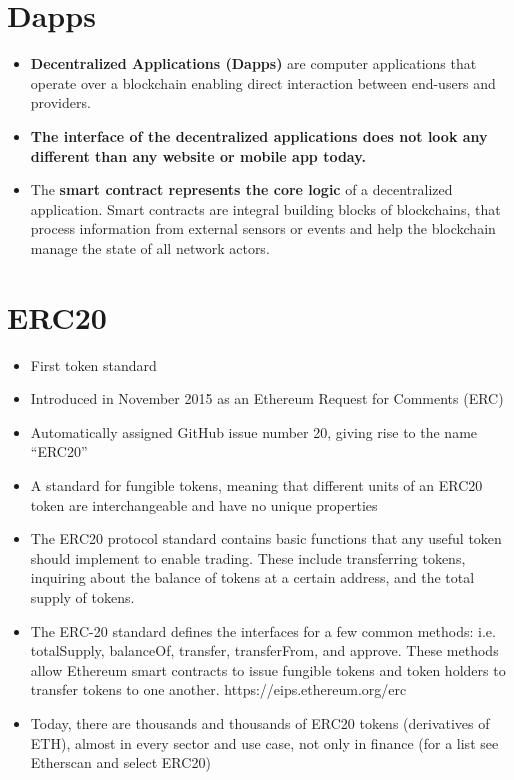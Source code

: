 \section{Dapps}
\begin{itemize}
	\item \textbf{Decentralized Applications (Dapps)} are computer applications that operate over a blockchain enabling direct interaction between end-users and providers.
	\item \textbf{The interface of the decentralized applications does not look any different than any website or mobile app today.}
	\item The\textbf{ smart contract represents the core logic} of a decentralized application. Smart contracts are integral building blocks of blockchains, that process information from external sensors or events and help the blockchain manage the state of all network actors.
\end{itemize}
\section{ERC20}
\begin{itemize}
	\item First token standard
	\item Introduced in November 2015 as an Ethereum Request for Comments (ERC)
	\item Automatically assigned GitHub issue number 20, giving rise to the name ``ERC20''
	\item A standard for fungible tokens, meaning that different units of an ERC20 token are interchangeable and have no unique properties
	\item The ERC20 protocol standard contains basic functions that any useful token should implement to enable trading. These include transferring tokens, inquiring about the balance of tokens at a certain address, and the total supply of tokens.
	\item The ERC-20 standard defines the interfaces for a few common methods: i.e. totalSupply, balanceOf, transfer, transferFrom, and approve. These methods allow Ethereum smart contracts to issue fungible tokens and token holders to transfer tokens to one another. https://eips.ethereum.org/erc
	\item Today, there are thousands and thousands of ERC20 tokens (derivatives of ETH), almost in every sector and use case, not only in finance (for a list see Etherscan and select ERC20)
\end{itemize}

